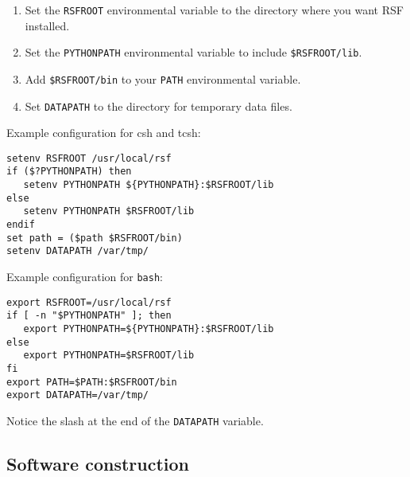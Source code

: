 \begin{enumerate}
\item  Set the \texttt{RSFROOT} environmental variable to the directory where you want RSF installed.
\item Set the \texttt{PYTHONPATH} environmental variable to include \texttt{\$RSFROOT/lib}. 
\item Add \texttt{\$RSFROOT/bin} to your \texttt{PATH} environmental variable.
\item Set \texttt{DATAPATH} to the directory for temporary data files. 
\end{enumerate}

Example configuration for csh and tcsh:
\begin{verbatim}
setenv RSFROOT /usr/local/rsf
if ($?PYTHONPATH) then
   setenv PYTHONPATH ${PYTHONPATH}:$RSFROOT/lib
else
   setenv PYTHONPATH $RSFROOT/lib
endif
set path = ($path $RSFROOT/bin)
setenv DATAPATH /var/tmp/
\end{verbatim}

Example configuration for \texttt{bash}:
\begin{verbatim}
export RSFROOT=/usr/local/rsf
if [ -n "$PYTHONPATH" ]; then
   export PYTHONPATH=${PYTHONPATH}:$RSFROOT/lib
else
   export PYTHONPATH=$RSFROOT/lib
fi
export PATH=$PATH:$RSFROOT/bin
export DATAPATH=/var/tmp/
\end{verbatim}

Notice the slash at the end of the \texttt{DATAPATH} variable.

\subsection{Software construction}

